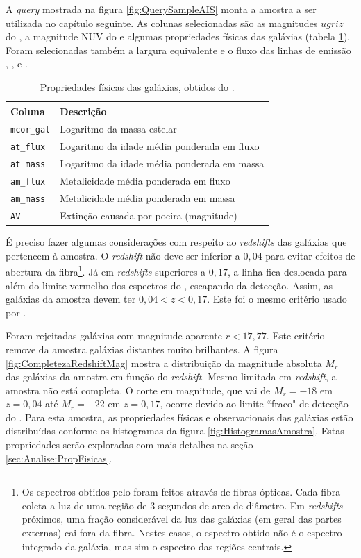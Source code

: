 A {\em query} mostrada na figura \ref{fig:QuerySampleAIS} monta a amostra a ser
utilizada no capítulo seguinte. As colunas selecionadas são as magnitudes
$ugriz$ do \SDSS, a magnitude NUV do \galex e algumas propriedades físicas das
galáxias (tabela \ref{tab:ParamFisicos}). Foram selecionadas também a largura
equivalente e o fluxo das linhas de emissão \Halpha, \Hbeta, \OIII e \NII.

\begin{table}
	\caption[Propriedades físicas das galáxias utilizados na amostra.]
	{Propriedades físicas das galáxias, obtidos do \starlight.}
	\begin{tabular}{l l}
		Coluna & Descrição \\
		\midrule
		\texttt{mcor\_gal} & Logaritmo da massa estelar \\
		\texttt{at\_flux}  & Logaritmo da idade média ponderada em fluxo \\
		\texttt{at\_mass}  & Logaritmo da idade média ponderada em massa \\
		\texttt{am\_flux}  & Metalicidade média ponderada em fluxo \\
		\texttt{am\_mass}  & Metalicidade média ponderada em massa \\
		\texttt{AV}        & Extinção causada por poeira (magnitude) \\
	\end{tabular}
	\label{tab:ParamFisicos}
\end{table}

É preciso fazer algumas  considerações com respeito ao {\em redshifts} das
galáxias que pertencem à amostra. O {\em redshift} não deve ser inferior a
$0,04$ para evitar efeitos de abertura da fibra\footnote{Os espectros obtidos
pelo \SDSS foram feitos através de fibras ópticas. Cada fibra coleta a luz de
uma região de 3 segundos de arco de diâmetro. Em {\em redshifts} próximos, uma
fração considerável da luz das galáxias (em geral das partes externas) cai fora
da fibra. Nestes casos, o espectro obtido não é o espectro integrado da galáxia,
mas sim o espectro das regiões centrais.}. Já em {\em redshifts} superiores a
$0,17$, a linha \NII fica deslocada para além do limite vermelho dos espectros
do \SDSS, escapando da detecção. Assim, as galáxias da amostra devem ter $0,04 <
z < 0,17$. Este foi o mesmo critério usado por \citet{CidFernandes2011}.

Foram rejeitadas galáxias com magnitude aparente $r<17,77$. Este critério remove
da amostra galáxias distantes muito brilhantes. A figura
\ref{fig:CompletezaRedshiftMag} mostra a distribuição da magnitude absoluta
$M_r$ das galáxias da amostra em função do {\em redshift}. Mesmo limitada em
{\em redshift}, a amostra não está completa. O corte em magnitude, que vai de
$M_r=-18$ em $z=0,04$ até $M_r=-22$ em $z=0,17$, ocorre devido ao limite
``fraco" de detecção do \SDSS. Para esta amostra, as propriedades físicas e
observacionais das galáxias estão distribuídas conforme os histogramas da figura
\ref{fig:HistogramasAmostra}. Estas propriedades serão exploradas com mais
detalhes na seção \ref{sec:Analise:PropFisicas}.

